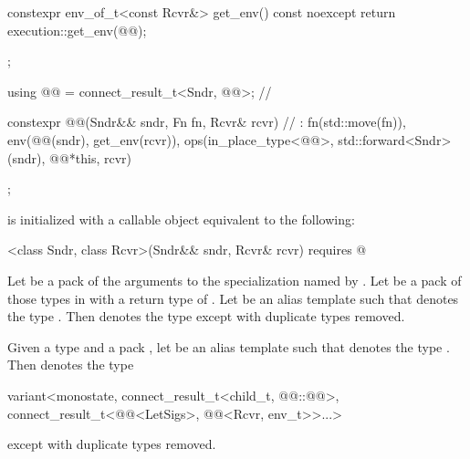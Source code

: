 \begin{codeblock}
{{    constexpr env_of_t<const Rcvr&> get_env() const noexcept {
      return execution::get_env(@@);
    }

  };

  using @@ = connect_result_t<Sndr, @@>;                                // \expos

  constexpr @@(Sndr&& sndr, Fn fn, Rcvr& rcvr)                           // \expos
    : fn(std::move(fn)), env(@@(sndr), get_env(rcvr)),
      ops(in_place_type<@@>, std::forward<Sndr>(sndr), @@{*this, rcvr}) {}

};
\end{codeblock}

\pnum
{}
is initialized with a callable object equivalent to the following:
\begin{codeblock}
[]<class Sndr, class Rcvr>(Sndr&& sndr, Rcvr& rcvr) requires @
\end{codeblock}

\pnum
Let  be a pack of the arguments
to the  specialization named by
.
Let  be a pack of those types in 
with a return type of .
Let  be an alias template
such that  denotes
the type .
Then  denotes
the type 
except with duplicate types removed.

\pnum
Given a type  and a pack ,
let  be an alias template
such that  denotes
the type .
Then  denotes
the type
\begin{codeblock}
variant<monostate,
        connect_result_t<child_t, @@::@@>,
        connect_result_t<@@<LetSigs>, @@<Rcvr, env_t>>...>
\end{codeblock}
except with duplicate types removed.

